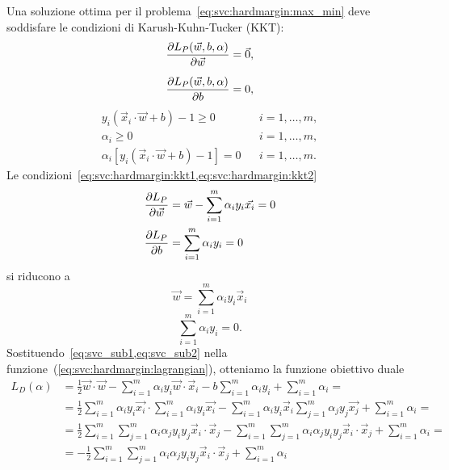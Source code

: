 %
%
Una soluzione ottima per il problema~\cref{eq:svc:hardmargin:max_min} deve soddisfare le condizioni di Karush-Kuhn-Tucker (KKT):
\begin{align}
    \label{eq:svc:hardmargin:kkt1}
    \frac{\partial{L_P(\Vec{w},b,\alpha)}}{\partial{\Vec{w}}} = \Vec{0}, \\[2mm]
    \label{eq:svc:hardmargin:kkt2}
    \frac{\partial{L_P(\Vec{w},b,\alpha)}}{\partial{b}} = 0, 
\end{align}
\begin{align}
    \label{eq:svc:hardmargin:kkt3}
    y_i(\Vec{x}_i\cdot\Vec{w}+b)-1 \geq 0 && i=1,\dots,m,  \\[2mm]
    \label{eq:svc:hardmargin:kkt4}
    \alpha_i \geq 0 && i=1,\dots,m,  \\[2mm]
    \label{eq:svc:hardmargin:kkt5}
    \alpha_i[y_i(\Vec{x}_i\cdot\Vec{w}+b)-1] = 0  && i=1,\dots,m.
\end{align}
%
Le condizioni~\cref{eq:svc:hardmargin:kkt1,eq:svc:hardmargin:kkt2}
\begin{align*}
    \frac{\partial{L_P}}{\partial{\Vec{w}}} &= \Vec{w} - \sum_{i=1}^{m}\alpha_iy_i\Vec{x_i} = 0\\
    \frac{\partial{L_P}}{\partial{b}} &=  \sum_{i=1}^{m}\alpha_iy_i =0
\end{align*}
si riducono a
\begin{equation}
\label{eq:svc_sub1}
\Vec{w} = \sum_{i=1}^{m}\alpha_iy_i\Vec{x}_i
\end{equation}
\begin{equation}
\label{eq:svc_sub2}
\sum_{i=1}^{m}\alpha_iy_i = 0.
\end{equation}
Sostituendo~\cref{eq:svc_sub1,eq:svc_sub2} nella funzione~(\ref{eq:svc:hardmargin:lagrangian}), 
otteniamo la funzione obiettivo duale
\begin{equation}
\label{eq:svc:hardmargin:dual_obj_fn}
\begin{split}
L_D(\alpha)  & = \frac{1}{2}\Vec{w}\cdot\Vec{w} - \sum_{i=1}^{m} \alpha_i y_i \Vec{w}\cdot \Vec{x}_i - b \sum_{i=1}^{m} \alpha_i y_i + \sum_{i=1}^{m} \alpha_i =\\
 &= \frac{1}{2}\sum_{i=1}^{m}\alpha_iy_i\Vec{x_i} \cdot \sum_{i=1}^{m}\alpha_iy_i\Vec{x_i} - \sum_{i=1}^{m} \alpha_i y_i \Vec{x}_i \sum_{j=1}^{m}\alpha_jy_j\Vec{x_j} + \sum_{i=1}^{m} \alpha_i =\\
 &= \frac{1}{2}\sum_{i=1}^{m}\sum_{j=1}^{m}\alpha_i\alpha_jy_iy_j\Vec{x}_i\cdot\Vec{x}_j - 
 \sum_{i=1}^{m}\sum_{j=1}^{m}\alpha_i\alpha_jy_iy_j\Vec{x}_i\cdot\Vec{x}_j + \sum_{i=1}^{m} \alpha_i =\\
 &= -\frac{1}{2}\sum_{i=1}^{m}\sum_{j=1}^{m}\alpha_i\alpha_jy_iy_j\Vec{x}_i\cdot\Vec{x}_j + \sum_{i=1}^{m} \alpha_i 
\end{split}  
\end{equation}
